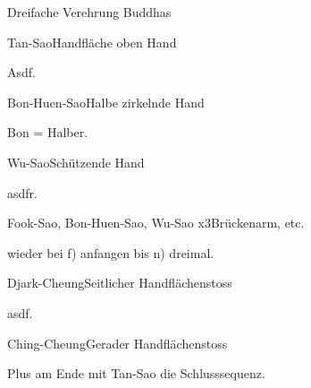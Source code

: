 
\begin{WTSatz}{Dreifache Verehrung Buddhas}%
	
	
	\begin{WTSatzTeil}{Tan-Sao}{Handfl\"ache oben Hand}
		
		Asdf.
	\end{WTSatzTeil}
	\begin{WTSatzTeil}{Bon-Huen-Sao}{Halbe zirkelnde Hand}
		
		Bon = Halber.
	\end{WTSatzTeil}
	\begin{WTSatzTeil}{Wu-Sao}{Sch\"utzende Hand}
		
		asdfr.
	\end{WTSatzTeil}
	\begin{WTSatzTeil}{Fook-Sao, Bon-Huen-Sao, Wu-Sao x3}{Br\"uckenarm, etc.}
		
		wieder bei f) anfangen bis n) dreimal.
	\end{WTSatzTeil}
	\begin{WTSatzTeil}{Djark-Cheung}{Seitlicher Handfl\"achenstoss}
		
		asdf.
	\end{WTSatzTeil}
	\begin{WTSatzTeil}{Ching-Cheung}{Gerader Handfl\"achenstoss}
		
		Plus am Ende mit Tan-Sao die Schlusssequenz.
	\end{WTSatzTeil}
\end{WTSatz}


